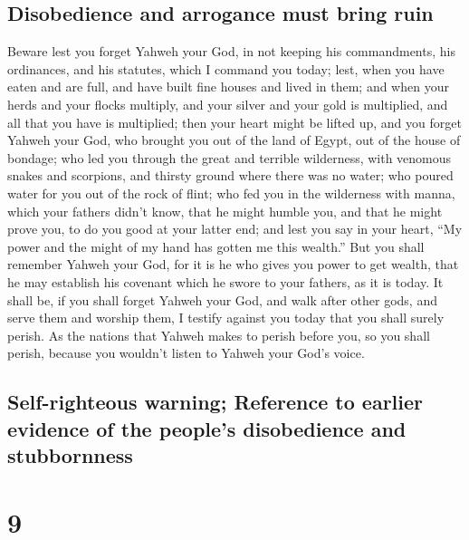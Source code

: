 \hypertarget{disobedience-and-arrogance-must-bring-ruin}{%
\subsection{Disobedience and arrogance must bring
ruin}\label{disobedience-and-arrogance-must-bring-ruin}}

 Beware lest you forget Yahweh your God, in not keeping
his commandments, his ordinances, and his statutes, which I command you
today;  lest, when you have eaten and are full, and have
built fine houses and lived in them;  and when your herds
and your flocks multiply, and your silver and your gold is multiplied,
and all that you have is multiplied;  then your heart
might be lifted up, and you forget Yahweh your God, who brought you out
of the land of Egypt, out of the house of bondage;  who
led you through the great and terrible wilderness, with venomous snakes
and scorpions, and thirsty ground where there was no water; who poured
water for you out of the rock of flint;  who fed you in
the wilderness with manna, which your fathers didn't know, that he might
humble you, and that he might prove you, to do you good at your latter
end;  and lest you say in your heart, ``My power and the
might of my hand has gotten me this wealth.''  But you
shall remember Yahweh your God, for it is he who gives you power to get
wealth, that he may establish his covenant which he swore to your
fathers, as it is today.  It shall be, if you shall
forget Yahweh your God, and walk after other gods, and serve them and
worship them, I testify against you today that you shall surely perish.
 As the nations that Yahweh makes to perish before you,
so you shall perish, because you wouldn't listen to Yahweh your God's
voice.

\hypertarget{self-righteous-warning-reference-to-earlier-evidence-of-the-peoples-disobedience-and-stubbornness}{%
\subsection{Self-righteous warning; Reference to earlier evidence of the
people's disobedience and
stubbornness}\label{self-righteous-warning-reference-to-earlier-evidence-of-the-peoples-disobedience-and-stubbornness}}

\hypertarget{section-8}{%
\section{9}\label{section-8}}

